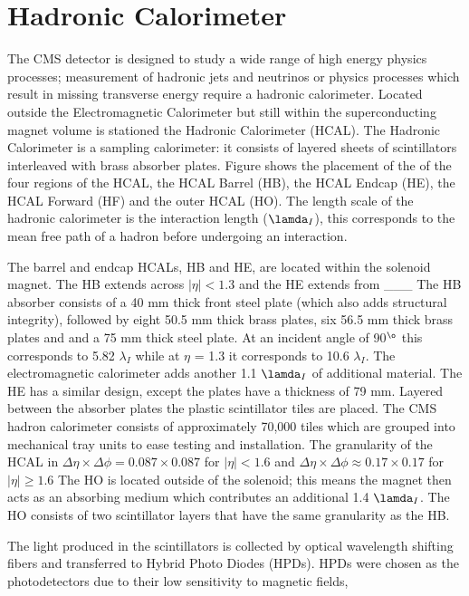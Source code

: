 \section{Hadronic Calorimeter}
The CMS detector is designed to study a wide range of high energy 
physics processes; measurement of hadronic jets and neutrinos or
physics processes which result in missing transverse energy require
a hadronic calorimeter. 
Located outside the Electromagnetic Calorimeter but still within the
superconducting magnet volume is stationed the Hadronic Calorimeter (HCAL).
The Hadronic Calorimeter is a sampling calorimeter: it consists of layered 
sheets of scintillators interleaved with brass absorber plates. 
Figure %
shows the placement of the of the four regions of the HCAL, the HCAL Barrel (HB),
the HCAL Endcap (HE), the HCAL Forward (HF) and the outer HCAL (HO). 
The length scale of the hadronic calorimeter is the interaction length ($\lamda_{I}$),
this corresponds to the mean free path of a hadron before undergoing
an interaction. 

The barrel and endcap HCALs, HB and HE, are located within the 
solenoid magnet. The HB extends across $|\eta|<1.3$ and the HE extends from ___
The HB absorber consists of a 40 mm thick front steel plate (which also adds structural integrity),
followed by eight 50.5 mm thick brass plates, six 56.5 mm thick brass plates and
and a 75 mm thick steel plate. At an incident angle of 90$^{\o}$ this corresponds %
to 5.82 $\lambda_{I}$ while at $\eta$ = 1.3 it corresponds to 10.6 $\lambda_{I}$.
The electromagnetic calorimeter adds another 1.1 $\lamda_{I}$ of additional
material. The HE has a similar design, except the plates have a thickness of 79 mm.
Layered between the absorber plates the plastic scintillator tiles are placed. The 
CMS hadron calorimeter consists of approximately 70,000 tiles which are grouped
into mechanical tray units to ease testing and installation.  
The granularity of the HCAL in $\Delta\eta \times \Delta\phi = 0.087 \times 0.087$
for $|\eta|<1.6$ and $\Delta\eta \times \Delta\phi \approx 0.17 \times 0.17$ for $|\eta|\ge1.6$
The HO is located outside of the solenoid; this means the magnet then acts as an absorbing
medium which contributes an additional 1.4 $\lamda_{I}$. The HO consists of two 
scintillator layers that have the same granularity as the HB. 

The light produced in the scintillators is collected by optical wavelength shifting fibers 
and transferred to Hybrid Photo Diodes (HPDs). HPDs were chosen as the photodetectors
due to their low sensitivity to magnetic fields, %


